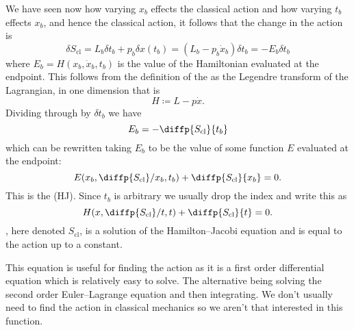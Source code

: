 \documentclass[fleqn]{NotesClass}
\newcommand*{\lagrangian}{L}
\newcommand*{\hamiltonian}{H}
\newcommand*{\cl}{\mathrm{cl}}
\begin{document}
    We have seen now how varying \(x_b\) effects the classical action and how varying \(t_b\) effects \(x_b\), and hence the classical action, it follows that the change in the action is
    \begin{equation}\label{eqn:dS = -E dt}
        \delta S_{\cl} = \lagrangian_b\delta t_b + p_b\delta x(t_b) = (\lagrangian_b - p_b\dot{x}_b)\delta t_b = -E_b \delta t_b
    \end{equation}
    where \(E_b = \hamiltonian(x_b, \dot{x}_b, t_b)\) is the value of the Hamiltonian evaluated at the endpoint.
    This follows from the definition of the  as the Legendre transform of the Lagrangian, in one dimension that is
    \begin{equation}
        \hamiltonian \coloneqq \lagrangian - p\dot{x}.
    \end{equation}
    Dividing through by \(\delta t_b\) we have
    \begin{equation}
        E_b = -\diffp{S_{\cl}}{t_b}
    \end{equation}
    which can be rewritten taking \(E_b \) to be the value of some function \(E\) evaluated at the endpoint:
    \begin{equation}
        E(x_b, \diffp{S_{\cl}}/{x_b}, t_b) + \diffp{S_{\cl}}{x_b} = 0.
    \end{equation}
    This is the  (HJ).
    Since \(t_b\) is arbitrary we usually drop the index and write this as
    \begin{equation}
        H(x, \diffp{S_{\cl}}/{t}, t) + \diffp{S_{\cl}}{t} = 0.
    \end{equation}
    , here denoted \(S_{\cl}\), is a solution of the Hamilton--Jacobi equation and is equal to the action up to a constant.
    
    This equation is useful for finding the action as it is a first order differential equation which is relatively easy to solve.
    The alternative being solving the second order Euler--Lagrange equation and then integrating.
    We don't usually need to find the action in classical mechanics so we aren't that interested in this function.
    
\end{document}
